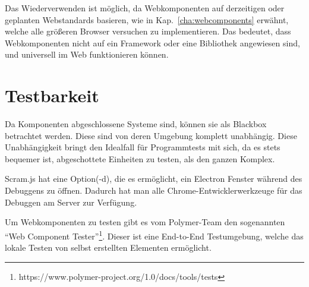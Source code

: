 Das Wiederverwenden ist möglich, da Webkomponenten auf derzeitigen oder geplanten Webstandards basieren, wie in Kap.~\ref{cha:webcomponents} erwähnt, welche alle größeren Browser versuchen zu implementieren. Das bedeutet, dass Webkomponenten nicht auf ein Framework oder eine Bibliothek angewiesen sind, und universell im Web funktionieren können.

\section{Testbarkeit}

Da Komponenten abgeschlossene Systeme sind, können sie als Blackbox betrachtet werden. Diese sind von deren Umgebung komplett unabhängig. Diese Unabhängigkeit bringt den Idealfall für Programmtests mit sich, da es stets bequemer ist, abgeschottete Einheiten zu testen, als den ganzen Komplex.

Scram.js hat eine Option(-d), die es ermöglicht, ein Electron Fenster während des Debuggens zu öffnen. Dadurch hat man alle Chrome-Entwicklerwerkzeuge für das Debuggen am Server zur Verfügung.

Um Webkomponenten zu testen gibt es vom Polymer-Team den sogenannten "`Web Component Tester"'\footnote{https://www.polymer-project.org/1.0/docs/tools/tests}. Dieser ist eine End-to-End Testumgebung, welche das lokale Testen von selbst erstellten Elementen ermöglicht.